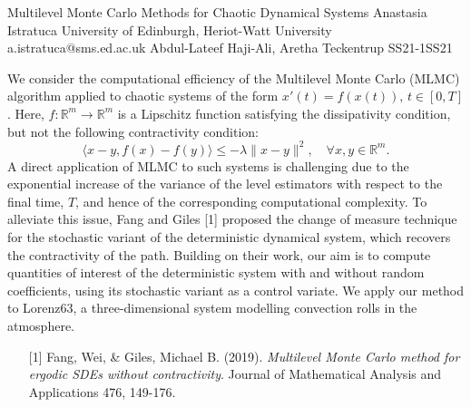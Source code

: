 \begin{talk}
  {Multilevel Monte Carlo Methods for Chaotic Dynamical Systems}%
  {Anastasia Istratuca}%
  {University of Edinburgh, Heriot-Watt University}%
  {a.istratuca@sms.ed.ac.uk}%
  {Abdul-Lateef Haji-Ali, Aretha Teckentrup}%
{}{}{SS21-1}{SS21}

			

\medskip

We consider the computational efficiency of the Multilevel Monte Carlo (MLMC) algorithm applied to chaotic systems of the form $x'(t) = f(x(t)), \, t \in [0, T]$. Here, $f : \mathbb{R}^m \rightarrow \mathbb{R}^m$ is a Lipschitz function satisfying the dissipativity condition, but not the following contractivity condition:
\begin{equation}
    \langle x-y, f(x)-f(y) \rangle \leq - \lambda \|x-y\|^2, \quad \forall x, y \in \mathbb{R}^m.
\end{equation}
A direct application of MLMC to such systems is challenging due to the exponential increase of the variance of the level estimators with respect to the final time, $T$, and hence of the corresponding computational complexity. To alleviate this issue, Fang and Giles [1] proposed the change of measure technique for the stochastic variant of the deterministic dynamical system, which recovers the contractivity of the path. Building on their work, our aim is to compute quantities of interest of the deterministic system with and without random coefficients, using its stochastic variant as a control variate. We apply our method to Lorenz63, a three-dimensional system modelling convection rolls in the atmosphere.

\begin{enumerate}
	\item[{[1]}] Fang, Wei, \& Giles, Michael B. (2019). {\it Multilevel Monte Carlo method for ergodic SDEs without contractivity}. Journal of Mathematical Analysis and Applications 476, 149-176.
\end{enumerate}



\end{talk}
